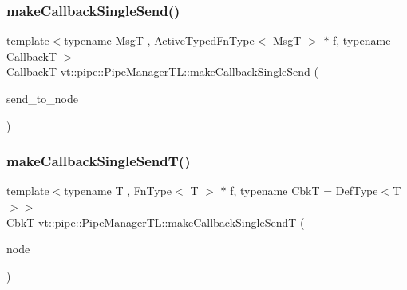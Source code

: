 \mbox{\label{structvt_1_1pipe_1_1_pipe_manager_t_l_ab160500f39018d96e56743095a1869e8}} 
\subsubsection{\texorpdfstring{make\+Callback\+Single\+Send()}{makeCallbackSingleSend()}\hspace{0.1cm}{\footnotesize\ttfamily [2/2]}}
{\footnotesize\ttfamily template$<$typename MsgT , Active\+Typed\+Fn\+Type$<$ Msg\+T $>$ $\ast$ f, typename CallbackT $>$ \\
CallbackT vt\+::pipe\+::\+Pipe\+Manager\+T\+L\+::make\+Callback\+Single\+Send (\begin{DoxyParamCaption}\item[{\hyperlink{namespacevt_a866da9d0efc19c0a1ce79e9e492f47e2}{Node\+Type} const \&}]{send\+\_\+to\+\_\+node }\end{DoxyParamCaption})}

\mbox{\label{structvt_1_1pipe_1_1_pipe_manager_t_l_aff917693da92fdfb5b275c7cf61e5e8b}} 
\subsubsection{\texorpdfstring{make\+Callback\+Single\+Send\+T()}{makeCallbackSingleSendT()}\hspace{0.1cm}{\footnotesize\ttfamily [1/2]}}
{\footnotesize\ttfamily template$<$typename T , Fn\+Type$<$ T $>$ $\ast$ f, typename CbkT  = Def\+Type$<$\+T$>$$>$ \\
CbkT vt\+::pipe\+::\+Pipe\+Manager\+T\+L\+::make\+Callback\+Single\+SendT (\begin{DoxyParamCaption}\item[{\hyperlink{namespacevt_a866da9d0efc19c0a1ce79e9e492f47e2}{Node\+Type} const \&}]{node }\end{DoxyParamCaption})}

